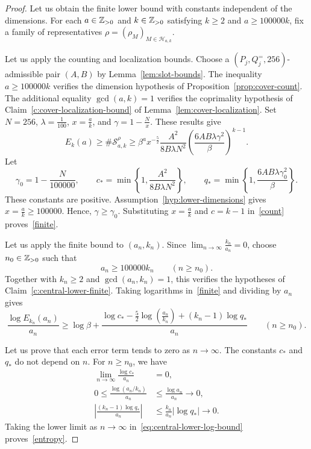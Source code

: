 \begin{proof}
 Let us obtain the finite lower bound with constants independent of the dimensions.
For each $a\in\mathbb Z_{>0}$ and $k\in\mathbb Z_{>0}$ satisfying $k\ge2$ and $a\ge100000k$, fix a family of representatives $\rho=(\rho_M)_{M\in\mathcal H_{a,k}}$.

Let us apply the counting and localization bounds.
Choose a $(P_j,Q_j^{=},256)$-admissible pair $(A,B)$ by Lemma~\ref{lem:slot-bounds}.
The inequality $a\ge100000k$ verifies the dimension hypothesis of Proposition~\ref{prop:cover-count}.
The additional equality $\gcd(a,k)=1$ verifies the coprimality hypothesis of
Claim~\ref{c:cover-localization-bound} of Lemma~\ref{lem:cover-localization}.
Set $N=256$, $\lambda=\frac1{100}$, $x=\frac ak$, and $\gamma=1-\frac Nx$.
These results give
\[
 E_k(a)\ge\#\mathcal S_{a,k}^{\rho}
 \ge\beta^a x^{-\frac52}\frac{A^2}{8B\lambda N^2}
 \left(\frac{6AB\lambda\gamma^2}{\beta}\right)^{k-1}.
\]
Let
\[
 \gamma_0=1-\frac{N}{100000},\qquad
 c_*=\min\left\{1,\frac{A^2}{8B\lambda N^2}\right\},\qquad
 q_*=\min\left\{1,\frac{6AB\lambda\gamma_0^2}{\beta}\right\}.
\]
These constants are positive. Assumption~\ref{hyp:lower-dimensions}
gives $x=\frac ak\ge100000$. Hence, $\gamma\ge\gamma_0$. Substituting $x=\frac{a}{k}$ and $c=k-1$ in~\eqref{count}
proves~\eqref{finite}.

 Let us apply the finite bound to $(a_n,k_n)$.
Since $\lim_{n\to\infty}\frac{k_n}{a_n}=0$, choose $n_0\in\mathbb Z_{>0}$ such that
\[
 a_n\ge100000k_n\qquad(n\ge n_0).
\]
Together with $k_n\ge2$ and $\gcd(a_n,k_n)=1$, this verifies the hypotheses of Claim~\ref{c:central-lower-finite}.
Taking logarithms in~\eqref{finite} and dividing by $a_n$ gives
\begin{equation}\label{eq:central-lower-log-bound}
 \frac{\log E_{k_n}(a_n)}{a_n}\ge\log\beta+
 \frac{\log c_*-\frac52\log\left(\frac{a_n}{k_n}\right)+(k_n-1)\log q_*}{a_n}
 \qquad(n\ge n_0).
\end{equation}

Let us prove that each error term tends to zero as $n\to\infty$.
The constants $c_*$ and $q_*$ do not depend on $n$.
For $n\ge n_0$, we have
\[
 \begin{aligned}
 \lim_{n\to\infty}\frac{\log c_*}{a_n}&=0,\\
 0\le\frac{\log(a_n/k_n)}{a_n}&\le\frac{\log a_n}{a_n}\longrightarrow0,\\
 \left|\frac{(k_n-1)\log q_*}{a_n}\right|
 &\le\frac{k_n}{a_n}|\log q_*|\longrightarrow0.
 \end{aligned}
\]
Taking the lower limit as $n\to\infty$ in~\eqref{eq:central-lower-log-bound} proves~\eqref{entropy}.
\end{proof}

